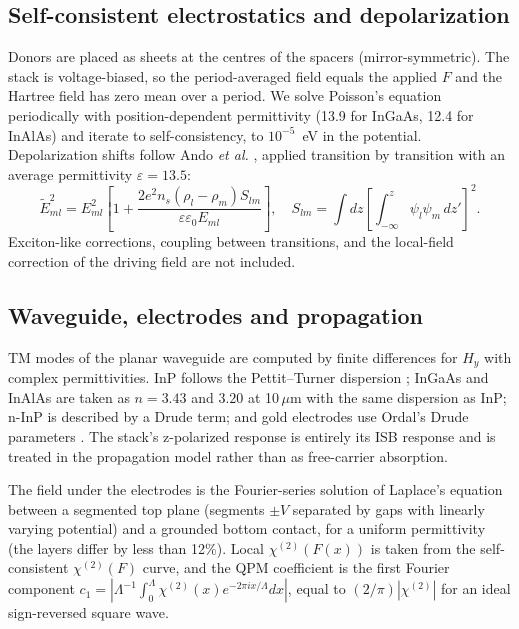 \documentclass[11pt]{article}
\newcommand{\chitwo}{\chi^{(2)}}
\newcommand{\um}{\,\mu\mathrm{m}}
\begin{document}
\subsection{Self-consistent electrostatics and depolarization}\label{sec:sc}
Donors are placed as sheets at the centres of the spacers (mirror-symmetric). The stack is voltage-biased, so the period-averaged field equals the applied $F$ and the Hartree field has zero mean over a period. We solve Poisson's equation periodically with position-dependent permittivity (13.9 for InGaAs, 12.4 for InAlAs) and iterate to self-consistency, to $10^{-5}$~eV in the potential. Depolarization shifts follow Ando \emph{et al.} \cite{Ando1982}, applied transition by transition with an average permittivity $\varepsilon=13.5$:
\begin{equation}
\tilde E_{ml}^2=E_{ml}^2\left[1+\frac{2e^2n_s(\rho_l-\rho_m)S_{lm}}{\varepsilon\varepsilon_0E_{ml}}\right],\quad S_{lm}=\int dz\left[\int_{-\infty}^{z}\psi_l\psi_m\,dz'\right]^2 .
\end{equation}
Exciton-like corrections, coupling between transitions, and the local-field correction of the driving field \cite{Zaluzny1995,Heyman1994} are not included.

\subsection{Waveguide, electrodes and propagation}
TM modes of the planar waveguide are computed by finite differences for $H_y$ with complex permittivities. InP follows the Pettit--Turner dispersion \cite{Pettit1965}; InGaAs and InAlAs are taken as $n=3.43$ and $3.20$ at 10$\um$ with the same dispersion as InP; n-InP is described by a Drude term; and gold electrodes use Ordal's Drude parameters \cite{Ordal1985}. The stack's z-polarized response is entirely its ISB response and is treated in the propagation model rather than as free-carrier absorption.

The field under the electrodes is the Fourier-series solution of Laplace's equation between a segmented top plane (segments $\pm V$ separated by gaps with linearly varying potential) and a grounded bottom contact, for a uniform permittivity (the layers differ by less than 12\%). Local $\chitwo(F(x))$ is taken from the self-consistent $\chitwo(F)$ curve, and the QPM coefficient is the first Fourier component $c_1=|\Lambda^{-1}\int_0^\Lambda\chitwo(x)e^{-2\pi ix/\Lambda}dx|$, equal to $(2/\pi)|\chitwo|$ for an ideal sign-reversed square wave.
\end{document}
